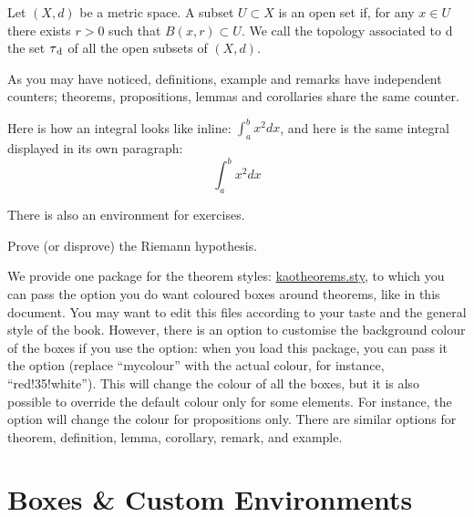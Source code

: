 \begin{remark}
Let $(X, d)$ be a metric space. A subset $U \subset X$ is an open set 
if, for any $x \in U$ there exists $r > 0$ such that $B(x, r) \subset 
U$. We call the topology associated to d the set $\tau\textsubscript{d}$ 
of all the open subsets of $(X, d).$
\end{remark}

As you may have noticed, definitions, example and remarks have 
independent counters; theorems, propositions, lemmas and corollaries 
share the same counter.

\begin{remark}
Here is how an integral looks like inline: $\int_{a}^{b} x^2 dx$, and 
here is the same integral displayed in its own paragraph:
\[\int_{a}^{b} x^2 dx\]
\end{remark}

There is also an environment for exercises.

\begin{exercise}
Prove (or disprove) the Riemann hypothesis.
\end{exercise}

We provide one package for the theorem styles: 
\href{kaotheorems.sty}{kaotheorems.sty}, to which you can pass the 
 option you do want coloured boxes around theorems, like 
in this document. You may want to edit this files according to your taste 
and the general style of the book. However, there is an option to 
customise the background colour of the boxes if you use the 
 option: when you load this package, you can pass it the 
 option (replace \enquote{mycolour} with the 
actual colour, for instance, \enquote{red!35!white}). This will change 
the colour of all the boxes, but it is also possible to override the 
default colour only for some elements. For instance, the 
 option will change the colour 
for propositions only. There are similar options for theorem, 
definition, lemma, corollary, remark, and example.

\section[Boxes \& Environments]{Boxes \& Custom Environments
}

